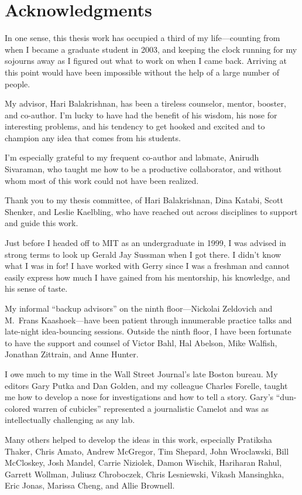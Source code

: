\chapter*{Acknowledgments}
%

In one sense, this thesis work has occupied a third of my
life---counting from when I became a graduate student in 2003, and
keeping the clock running for my sojourns away as I figured out what
to work on when I came back. Arriving at this point would have been
impossible without the help of a large number of people.

My advisor, Hari Balakrishnan, has been a tireless counselor, mentor,
booster, and co-author. I'm lucky to have had the benefit of his
wisdom, his nose for interesting problems, and his tendency to get
hooked and excited and to champion any idea that comes from his students.

I'm especially grateful to my frequent co-author and labmate, Anirudh
Sivaraman, who taught me how to be a productive collaborator, and
without whom most of this work could not have been realized.

Thank you to my thesis committee, of Hari Balakrishnan, Dina Katabi,
Scott Shenker, and Leslie Kaelbling, who have reached out across
disciplines to support and guide this work.

Just before I headed off to MIT as an undergraduate in 1999, I was
advised in strong terms to look up Gerald Jay Sussman when I got
there. I didn't know what I was in for! I have worked with Gerry since
I was a freshman and cannot easily express how much I have gained from
his mentorship, his knowledge, and his sense of taste.

My informal ``backup advisors'' on the ninth floor---Nickolai
Zeldovich and M.~Frans Kaashoek---have been patient through
innumerable practice talks and late-night idea-bouncing
sessions. Outside the ninth floor, I have been fortunate to have the
support and counsel of Victor Bahl, Hal Abelson, Mike Walfish,
Jonathan Zittrain, and Anne Hunter.

I owe much to my time in the Wall Street Journal's late Boston
bureau. My editors Gary Putka and Dan Golden, and my colleague Charles
Forelle, taught me how to develop a nose for investigations and how to
tell a story. Gary's ``dun-colored warren of cubicles'' represented a
journalistic Camelot and was as intellectually challenging as any lab.

Many others helped to develop the ideas in this work, especially
Pratiksha Thaker, Chris Amato, Andrew McGregor, Tim Shepard, John
Wroclawski, Bill McCloskey, Josh Mandel, Carrie Niziolek, Damon
Wischik, Hariharan Rahul, Garrett Wollman, Juliusz Chroboczek, Chris
Lesniewski, Vikash Mansinghka, Eric Jonas, Marissa Cheng, and Allie
Brownell.

